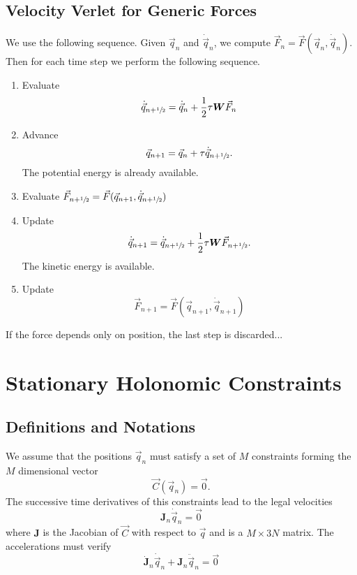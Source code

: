 \documentclass[aps,twocolumn]{revtex4}
\newcommand{\mymat}[1]{\boldsymbol{#1}}
\newcommand{\half}{\sfrac{1}{2}}
\newcommand{\q}{\vec{q}}
\newcommand{\dq}{\dot{\q}}
\newcommand{\ddq}{\ddot{\q}}
\newcommand{\C}{\vec{C}}
\newcommand{\J}{\mymat{J}}
\newcommand{\dJ}{\dot{\J}}
\newcommand{\W}{\mymat{W}}
\begin{document}
\subsection{Velocity Verlet for Generic Forces}
We use the following sequence.
Given $\q_n$ and $\dq_n$, we compute $\vec{F}_n=\vec{F}(\q_n,\dq_n)$.
Then for each time step we perform the following sequence.
\begin{enumerate}
	\item Evaluate \begin{equation} 
	\dq_{n+\half} = \dq_n + \frac{1}{2}\tau \mymat{W}\vec{F}_n
	\end{equation}
		\item Advance \begin{equation}
	\q_{n+1}  = \q_n + \tau \dq_{n+\half}.
	\end{equation} 
	The potential energy is already available.
	\item Evaluate $\vec{F}_{n+\half}=\vec{F}(\q_{n+1},\dq_{n+\half})$
	\item Update
	\begin{equation}
		\dq_{n+1} = \dq_{n+\half} + \frac{1}{2} \tau \W \vec{F}_{n+\half}.
	\end{equation}
	The kinetic energy is available.
	\item Update
	\begin{equation}
		\vec{F}_{n+1}=\vec{F}(\q_{n+1},\dq_{n+1})
	\end{equation}
\end{enumerate}
If the force depends only on position, the last step is discarded...

\section{Stationary Holonomic Constraints}
\subsection{Definitions and Notations}
We assume that the positions $\q_n$ must satisfy a set of $M$ constraints forming
the $M$ dimensional vector
\begin{equation}
\label{eq:C}
	\C(\q_n) = \vec{0}.
\end{equation}
The successive time derivatives of this constraints lead to the legal velocities
\begin{equation}
	\label{eq:J}
	\J_n\dq_n  = \vec{0}
\end{equation}
where $\J$ is the Jacobian of $\C$ with respect to $\q$ and is a $M\times3N$ matrix.
The accelerations must verify
\begin{equation}
	\label{eq:accel}
	\dJ_n\dq_n + \J_n\ddq_n = \vec{0}
\end{equation}
\end{document}
